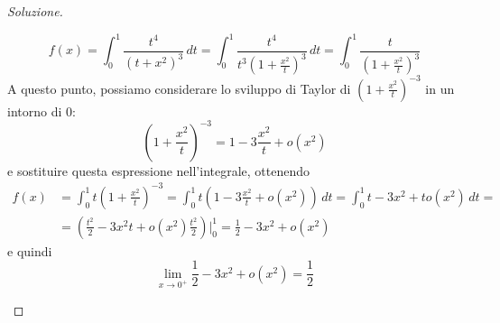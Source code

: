 \begin{proof}[Soluzione]
\begin{enumerate}[(i)]
        \[
        f(x) = \int_0^1 \frac{t^4}{(t+x^2)^3}\, dt = \int_0^1 \frac{t^4}{t^3\left(1+\frac{x^2}{t}\right)^3}\, dt = \int_0^1 \frac{t}{\left(1+\frac{x^2}{t}\right)^3}
        \]
        A questo punto, possiamo considerare lo sviluppo di Taylor di $\left(1+\frac{x^2}{t}\right)^{-3}$ in un intorno di 0:
        \[
        \left(1+\frac{x^2}{t}\right)^{-3} = 1 -3\frac{x^2}{t} + o(x^2)
        \]
        e sostituire questa espressione nell'integrale, ottenendo
        \[
        \begin{split}
            f(x) & = \int_0^1 t\left(1+\frac{x^2}{t}\right)^{-3} = \int_0^1 t\left(1-3\frac{x^2}{t}+o(x^2)\right)\, dt = \int_0^1 t - 3x^2 + to(x^2)\, dt = \\
            & = \left(\frac{t^2}{2}-3x^2t+o(x^2)\frac{t^2}{2}\right)\bigg|_0^1 = \frac{1}{2}-3x^2 +o(x^2)
        \end{split}
        \]
        e quindi
        \[
        \lim_{x\to 0^+} \frac{1}{2}-3x^2 +o(x^2) = \frac{1}{2}
        \]
    \end{enumerate} 
\end{proof}
